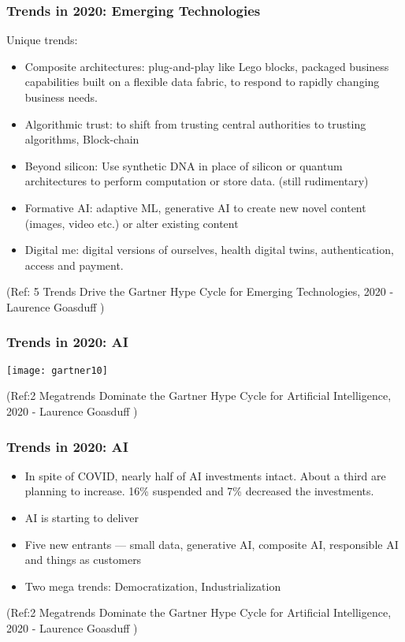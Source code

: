 \begin{frame}[fragile]\frametitle{Trends in 2020: Emerging Technologies}

Unique trends:

\begin{itemize}
\item Composite architectures: plug-and-play like Lego blocks, packaged business capabilities built on a flexible data fabric, to respond to rapidly changing business needs.
\item Algorithmic trust: to shift from trusting central authorities to trusting algorithms, Block-chain
\item Beyond silicon: Use synthetic DNA in place of silicon or quantum architectures to perform computation or store data. (still rudimentary)
\item Formative AI: adaptive ML, generative AI to create new novel content (images, video etc.) or alter existing content
\item Digital me: digital versions of ourselves, health digital twins, authentication, access and payment.
\end{itemize}


{\tiny (Ref: 5 Trends Drive the Gartner Hype Cycle for Emerging Technologies, 2020 - Laurence Goasduff )}

\end{frame}

\begin{frame}[fragile]\frametitle{Trends in 2020: AI}

\begin{center}
\texttt{[image: gartner10]}
\end{center}

{\tiny (Ref:2 Megatrends Dominate the Gartner Hype Cycle for Artificial Intelligence, 2020 - Laurence Goasduff )}

\end{frame}

\begin{frame}[fragile]\frametitle{Trends in 2020: AI}

\begin{itemize}
\item In spite of COVID, nearly half of AI investments intact. About a third are planning to increase. 16\% suspended and 7\% decreased the investments.
\item AI is starting to deliver
\item Five new entrants — small data, generative AI, composite AI, responsible AI and things as customers
\item Two mega trends: Democratization, Industrialization
\end{itemize}


{\tiny (Ref:2 Megatrends Dominate the Gartner Hype Cycle for Artificial Intelligence, 2020 - Laurence Goasduff )}

\end{frame}

